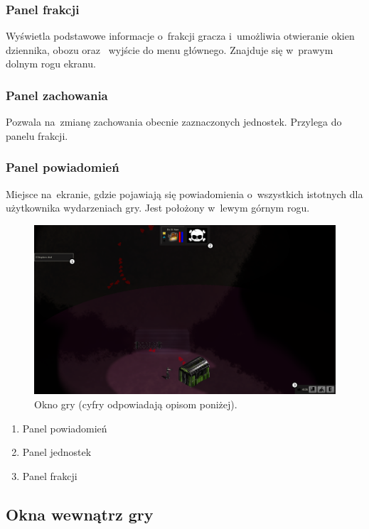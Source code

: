 \documentclass[licencjacka]{pracamgr}
\begin{document}
      \subsubsection{Panel frakcji}
	Wyświetla podstawowe informacje o~frakcji gracza i~umożliwia otwieranie okien dziennika, obozu oraz~ wyjście do menu głównego.
	Znajduje się w~prawym dolnym rogu ekranu.
      \subsubsection{Panel zachowania}
	Pozwala na~zmianę zachowania obecnie zaznaczonych jednostek. Przylega do panelu frakcji.
      \subsubsection{Panel powiadomień}
	Miejsce na~ekranie, gdzie pojawiają się powiadomienia o~wszystkich istotnych dla użytkownika wydarzeniach gry. Jest położony w~lewym górnym rogu.

      \begin{figure}[htbp]
	\centering
	\includegraphics[scale=0.22]{Game.png}
	\caption{Okno gry (cyfry odpowiadają opisom poniżej).}
      \end{figure}

      \begin{enumerate}
       \item Panel powiadomień
       \item Panel jednostek
       \item Panel frakcji
      \end{enumerate}

    \subsection{Okna wewnątrz gry}
\end{document}
